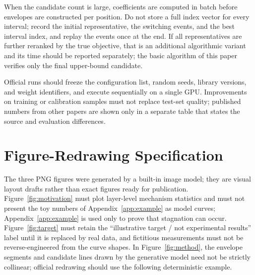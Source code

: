 When the candidate count is large, coefficients are computed in batch before envelopes are constructed per position.
Do not store a full index vector for every interval; record the initial representative, the switching events, and the best interval index, and replay the events once at the end.
If all representatives are further reranked by the true objective, that is an additional algorithmic variant and its time should be reported separately; the basic algorithm of this paper verifies only the final upper-bound candidate.

Official runs should freeze the configuration list, random seeds, library versions, and weight identifiers, and execute sequentially on a single GPU.
Improvements on training or calibration samples must not replace test-set quality; published numbers from other papers are shown only in a separate table that states the source and evaluation differences.

\section{Figure-Redrawing Specification}
\label{app:figures}

The three PNG figures were generated by a built-in image model; they are visual layout drafts rather than exact figures ready for publication.
Figure~\ref{fig:motivation} must plot layer-level mechanism statistics and must not present the toy numbers of Appendix~\ref{app:example} as model curves; Appendix~\ref{app:example} is used only to prove that stagnation can occur.
Figure~\ref{fig:target} must retain the ``illustrative target / not experimental results'' label until it is replaced by real data, and fictitious measurements must not be reverse-engineered from the curve shapes.
In Figure~\ref{fig:method}, the envelope segments and candidate lines drawn by the generative model need not be strictly collinear; official redrawing should use the following deterministic example.


